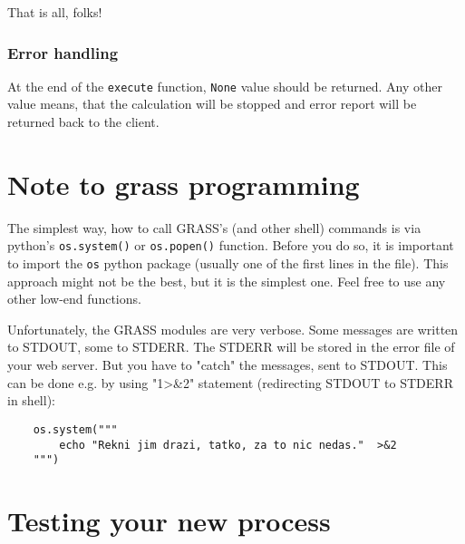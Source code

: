 \documentclass[a4paper,11pt]{article}
\begin{document}
     
    That is all, folks!
     

    \subsubsection{Error handling}
     
    At the end of the \texttt{execute} function, \texttt{None} value should be returned. Any other 
    value means, that the calculation will be stopped and error report will be returned back to the client.
     


    \section{Note to grass programming}
     
    The simplest way, how to call GRASS's (and other shell) commands is via
    python's \texttt{os.system()} or \texttt{os.popen()} function. 
    Before you do so, it is important to import
    the \texttt{os} python package (usually one of the first lines in the file). This
    approach might not be the best, but it is the simplest one. Feel free to use any other low-end functions.
     
     
    Unfortunately, the GRASS modules are very verbose. Some messages are
    written to STDOUT, some to STDERR. The STDERR will be stored in the error
    file of your web server. But you have to "catch" the messages, sent to
    STDOUT. This can be done e.g. by using "1>\&2" statement (redirecting STDOUT
    to STDERR in shell):
     

    \begin{verbatim}
    os.system("""
        echo "Rekni jim drazi, tatko, za to nic nedas."  >&2
    """)
    \end{verbatim}

    
    \section{Testing your new process}
\end{document}
